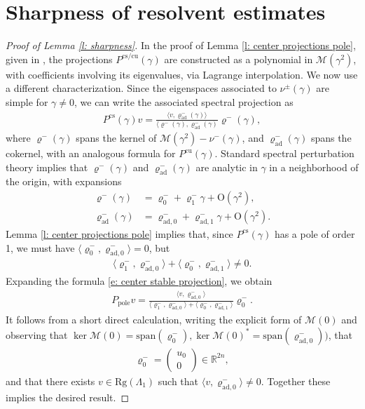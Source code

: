 \documentclass[11pt]{article}
\newcommand{\R}{\mathbb{R}}
\newcommand{\spn}{\text{\span}}
\numberwithin{equation}{section}
\numberwithin{prop}{section}
\renewcommand{\spn}{\mathrm{span}}
\begin{document}
\section{Sharpness of resolvent estimates}\label{app: sharpness}
\begin{proof}[Proof of Lemma \ref{l: sharpness}]
	In the proof of Lemma \ref{l: center projections pole}, given in \cite[Lemma 2.2]{SIMA}, the projections $P^\mathrm{cs/cu}(\gamma)$ are constructed as a polynomial in $\mathcal{M}(\gamma^2)$, with coefficients involving its eigenvalues, via Lagrange interpolation. We now use a different characterization. Since the eigenspaces associated to $\nu^\pm(\gamma)$ are simple for $\gamma \neq 0$, we can write the associated spectral projection as
	\begin{align}
	P^\mathrm{cs}(\gamma) v = \frac{\langle v, \varrho^-_\mathrm{ad}(\gamma)\rangle}{\langle \varrho^-(\gamma), \varrho^-_\mathrm{ad}(\gamma)} \varrho^-(\gamma), \label{e: center stable projection}
	\end{align}
	where $\varrho^-(\gamma)$ spans the kernel of $\mathcal{M}(\gamma^2) - \nu^-(\gamma)$, and $\varrho^-_\mathrm{ad}(\gamma)$ spans the cokernel, with an analogous formula for $P^\mathrm{cu}(\gamma)$. Standard spectral perturbation theory \cite[Chapter 2]{Kato} implies that $\varrho^-(\gamma)$ and $\varrho^-_\mathrm{ad}(\gamma)$ are analytic in $\gamma$ in a neighborhood of the origin, with expansions
	\begin{align*}
	\varrho^-(\gamma) &= \varrho^-_0 + \varrho^-_1 \gamma + \mathrm{O}(\gamma^2), \\
	\varrho^-_\mathrm{ad}(\gamma) &= \varrho^-_{\mathrm{ad},0} + \varrho^-_{\mathrm{ad},1} \gamma + \mathrm{O}(\gamma^2). 
	\end{align*}
	Lemma \ref{l: center projections pole} implies that, since $P^\mathrm{cs}(\gamma)$ has a pole of order 1, we must have $\langle \varrho_0^-, \varrho^-_{\mathrm{ad},0} \rangle = 0$, but 
	\begin{align*}
	\langle \varrho^-_1, \varrho^-_{\mathrm{ad},0}\rangle + \langle \varrho^-_0, \varrho^-_{\mathrm{ad},1} \rangle \neq 0. 
	\end{align*}
	Expanding the formula \eqref{e: center stable projection}, we obtain
	\begin{align}
	P_\mathrm{pole} v = \frac{\langle v, \varrho^-_{\mathrm{ad},0} \rangle}{\langle \varrho^-_1, \varrho^-_{\mathrm{ad},0}\rangle + \langle \varrho^-_0, \varrho^-_{\mathrm{ad},1} \rangle} \varrho^-_0. 
	\end{align}
	{}	It follows from a short direct calculation, writing the explicit form of $\mathcal{M}(0)$ and observing that $\ker \mathcal{M}(0) = \spn ( \varrho^-_0), \ker \mathcal{M}(0)^* = \spn (\varrho^-_{\mathrm{ad,0}}))$, that 
	\begin{align}
	\varrho^-_0 = \begin{pmatrix} u_0 \\ 0 \end{pmatrix} \in \R^{2n},
	\end{align}
	and that there exists $v \in \mathrm{Rg} (\Lambda_1)$ such that $\langle v, \varrho^-_{\mathrm{ad},0} \rangle \neq 0$. Together these implies the desired result.  
\end{proof}







\end{document}
